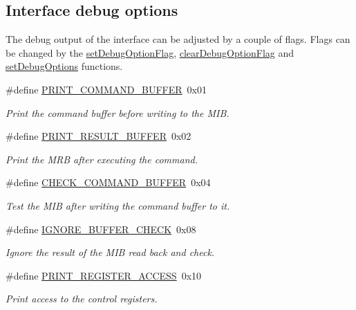 \subsection*{Interface debug options}
The debug output of the interface can be adjusted by a couple of flags. Flags can be changed by the \hyperlink{group__dcsc__msg__buffer__access_g36bb01dae6dd6edf579fe9878f9c6a20}{set\-Debug\-Option\-Flag}, \hyperlink{group__dcsc__msg__buffer__access_g41201fc4dd5608bce4261b34eec28ca4}{clear\-Debug\-Option\-Flag} and \hyperlink{group__dcsc__msg__buffer__access_gc07186b103fbe4c39531665c95e22c7e}{set\-Debug\-Options} functions. \begin{CompactItemize}
\item 
\#define \hyperlink{group__dcsc__msg__buffer__access_gdcd41743796fdb5a280fc3914121eb05}{PRINT\_\-COMMAND\_\-BUFFER}~0x01
\begin{CompactList}\small\item\em Print the command buffer before writing to the MIB. \item\end{CompactList}\item 
\#define \hyperlink{group__dcsc__msg__buffer__access_gcbc0bfb0d39b96550d664a58aa705cbb}{PRINT\_\-RESULT\_\-BUFFER}~0x02
\begin{CompactList}\small\item\em Print the MRB after executing the command. \item\end{CompactList}\item 
\#define \hyperlink{group__dcsc__msg__buffer__access_g9eba95d21cfe8d57e7d52cadc13e1b91}{CHECK\_\-COMMAND\_\-BUFFER}~0x04
\begin{CompactList}\small\item\em Test the MIB after writing the command buffer to it. \item\end{CompactList}\item 
\#define \hyperlink{group__dcsc__msg__buffer__access_g4115ae88155913f9a07bfbbd995f5e4f}{IGNORE\_\-BUFFER\_\-CHECK}~0x08
\begin{CompactList}\small\item\em Ignore the result of the MIB read back and check. \item\end{CompactList}\item 
\#define \hyperlink{group__dcsc__msg__buffer__access_gc3ceb106888209dd1796a27d49f567d8}{PRINT\_\-REGISTER\_\-ACCESS}~0x10
\begin{CompactList}\small\item\em Print access to the control registers. \item\end{CompactList}\item 

\end{CompactItemize}
